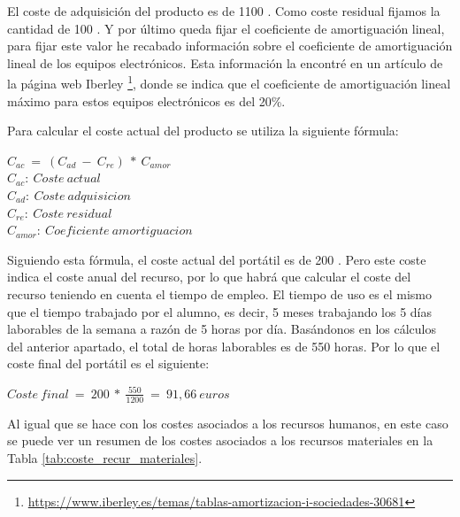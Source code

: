 El coste de adquisición del producto es de 1100 \EURtm. Como coste residual fijamos la cantidad de 100 \EURtm. Y por último queda fijar el coeficiente de amortiguación lineal, para fijar este valor he recabado información sobre el coeficiente de amortiguación lineal de los equipos electrónicos. Esta información la encontré en un artículo de la página web Iberley \footnote{\url{https://www.iberley.es/temas/tablas-amortizacion-i-sociedades-30681}}, donde se indica que el coeficiente de amortiguación lineal máximo para estos equipos electrónicos es del 20\%.

Para calcular el coste actual del producto se utiliza la siguiente fórmula:

\begin{center}
$C_{ac}\ =\ (C_{ad}\ -\ C_{re})\ *\ C_{amor}$\\
$C_{ac}:\ Coste\ actual$\\
$C_{ad}:\ Coste\ adquisicion$\\
$C_{re}:\ Coste\ residual$\\
$C_{amor}:\ Coeficiente\ amortiguacion$
\end{center}

Siguiendo esta fórmula, el coste actual del portátil es de 200 \EURtm. Pero este coste indica el coste anual del recurso, por lo que habrá que calcular el coste del recurso teniendo en cuenta el tiempo de empleo. El tiempo de uso es el mismo que el tiempo trabajado por el alumno, es decir, 5 meses trabajando los 5 días laborables de la semana a razón de 5 horas por día. Basándonos en los cálculos del anterior apartado, el total de horas laborables es de 550 horas. Por lo que el coste final del portátil es el siguiente:

\begin{center}
$Coste\ final\ =\ 200\ *\ \frac{550}{1200}\ =\ 91,66\ euros$
\end{center}

Al igual que se hace con los costes asociados a los recursos humanos, en este caso se puede ver un resumen de los costes asociados a los recursos materiales en la Tabla \ref{tab:coste_recur_materiales}.

\begin{table}[h]
\centering
{}
\caption{Costes asociados a los recursos materiales}
\label{tab:coste_recur_materiales}
\end{table}

